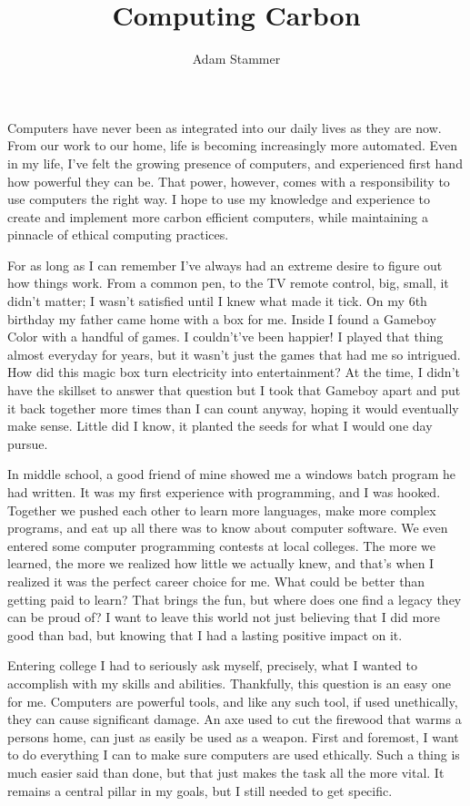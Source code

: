 \documentclass{article}
\begin{document}
\title{Computing Carbon}
\author{Adam Stammer}
\date{}
\maketitle



Computers have never been as integrated into our daily lives as they are now. From our work to our home, life is becoming increasingly more automated. Even in my life, I've felt the growing presence of computers, and experienced first hand how powerful they can be. That power, however, comes with a responsibility to use computers the right way. I hope to use my knowledge and experience to create and implement more carbon efficient computers, while maintaining a pinnacle of ethical computing practices.

For as long as I can remember I've always had an extreme desire to figure out how things work. From a common pen, to the TV remote control, big, small, it didn't matter; I wasn't satisfied until I knew what made it tick. On my 6th birthday my father came home with a box for me. Inside I found a Gameboy Color with a handful of games. I couldn't've been happier! I played that thing almost everyday for years, but it wasn't just the games that had me so intrigued. How did this magic box turn electricity into entertainment? At the time, I didn't have the skillset to answer that question but I took that Gameboy apart and put it back together more times than I can count anyway, hoping it would eventually make sense. Little did I know, it planted the seeds for what I would one day pursue.

In middle school, a good friend of mine showed me a windows batch program he had written. It was my first experience with programming, and I was hooked. Together we pushed each other to learn more languages, make more complex programs, and eat up all there was to know about computer software. We even entered some computer programming contests at local colleges. The more we learned, the more we realized how little we actually knew, and that's when I realized it was the perfect career choice for me. What could be better than getting paid to learn? That brings the fun, but where does one find a legacy they can be proud of? I want to leave this world not just believing that I did more good than bad, but knowing that I had a lasting positive impact on it.

Entering college I had to seriously ask myself, precisely, what I wanted to accomplish with my skills and abilities. Thankfully, this question is an easy one for me. Computers are powerful tools, and like any such tool, if used unethically, they can cause significant damage. An axe used to cut the firewood that warms a persons home, can just as easily be used as a weapon. First and foremost, I want to do everything I can to make sure computers are used ethically. Such a thing is much easier said than done, but that just makes the task all the more vital. It remains a central pillar in my goals, but I still needed to get specific.
\end{document}
